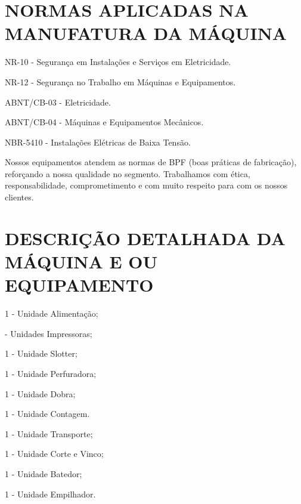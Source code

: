 \thispagestyle{fancy}

\vspace*{40 pt}

\section{\large{NORMAS APLICADAS NA MANUFATURA DA MÁQUINA}}
\label{sec:normas}


\begin{standartsMet}
    \item NR-10 - Segurança em Instalações e Serviços em Eletricidade.
    \item NR-12 - Segurança no Trabalho em Máquinas e Equipamentos.
    \item ABNT/CB-03 - Eletricidade.
    \item ABNT/CB-04 - Máquinas e Equipamentos Mecânicos.
    \item NBR-5410 - Instalações Elétricas de Baixa Tensão.
\end{standartsMet}

Nossos equipamentos atendem as normas de BPF (boas práticas de fabricação), reforçando a nossa qualidade no segmento.
Trabalhamos com ética, responsabilidade, comprometimento e com muito respeito para com os nossos clientes.

\section{\large{\MakeUppercase{Descrição Detalhada da Máquina e ou Equipamento}}}
\label{sec:machineDescription}


\begin{machinePartsList}
    \item 1 - Unidade Alimentação;
    \item \numberOfPrinters \space - Unidades Impressoras;
    \ifmachineType
        \item 1 - Unidade Slotter;
        \ifunidadePerfuradora
        \item 1 - Unidade Perfuradora;
        \fi
        \item 1 - Unidade Dobra;
        \item 1 - Unidade Contagem.
    \else
        \item 1 - Unidade Transporte;
        \item 1 - Unidade Corte e Vinco;
        \item 1 - Unidade Batedor;
        \item 1 - Unidade Empilhador.
    \fi
\end{machinePartsList}

